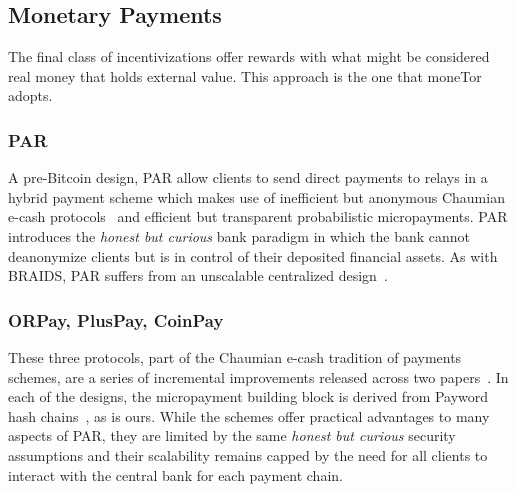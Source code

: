 \subsection{Monetary Payments}
\label{sub:monetary}

The final class of incentivizations offer rewards with what might be considered
real money that holds external value. This approach is the one that moneTor adopts.

\subsubsection{PAR} A pre-Bitcoin design, PAR allow clients to send direct
payments to relays in a hybrid payment scheme which makes use of inefficient but
anonymous Chaumian e-cash protocols~\cite{chaum1988untraceable} and efficient
but transparent probabilistic micropayments. PAR introduces the \emph{honest but
  curious} bank paradigm in which the bank cannot deanonymize clients but is in
control of their deposited financial assets. As with BRAIDS, PAR suffers from an
unscalable centralized design~\cite{androulaki2008payment}.

\subsubsection{ORPay, PlusPay, CoinPay} These three protocols, part of the
Chaumian e-cash tradition of payments schemes, are a series of incremental
improvements released across two papers~\cite{chen2009xpay,
  carbunar2012tipping}. In each of the designs, the micropayment building block
is derived from Payword hash chains~\cite{rivest1996payword}, as is ours. While
the schemes offer practical advantages to many aspects of PAR, they are limited
by the same \emph{honest but curious} security assumptions and their scalability
remains capped by the need for all clients to interact with the central bank for
each payment chain.

